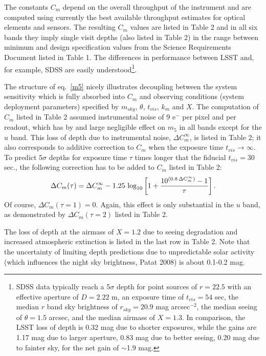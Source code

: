 The constants $C_m$ depend on the overall throughput of the instrument
and are computed using currently the best available throughput estimates for
optical elements and sensors. The resulting $C_m$ values are listed in Table 2
and in all six bands they imply single visit depths (also listed in Table 2) in the range
between minimum and design specification values from the Science Requirements
Document listed in Table 1.
The differences in performance between LSST and, for example, SDSS are easily
understood\footnote{SDSS data
typically reach a 5$\sigma$ depth for point sources of $r=22.5$
with an effective aperture of $D=2.22$ m, an exposure time of $t_{vis}=54$
sec, the median $r$ band sky brightness of $r_{sky}=20.9$ mag arcsec$^{-2}$,
the median seeing of $\theta=1.5$ arcsec, and the median airmass of $X=1.3$.
In comparison, the LSST loss of depth is 0.32 mag due to shorter exposures,
while the gains are 1.17 mag due to larger aperture, 0.83 mag due to better
seeing, 0.20 mag due to fainter sky, for the net gain of $\sim$1.9 mag.}.

The structure of eq.~\ref{m5} nicely illustrates decoupling between the system
sensitivity which is fully absorbed into $C_m$ and observing conditions
(system deployment parameters) specified by $m_{sky}$, $\theta$, $t_{vis}$, $k_m$
and $X$. The computation of $C_m$ listed in Table 2 assumed instrumental noise of
9 e$^-$ per pixel and per readout, which has by and large negligible effect on $m_5$ in
all bands except for the $u$ band. This loss of depth due to instrumental noise, $\Delta C^{\infty}_m$,
is listed in Table 2; it also corresponds to additive correction to $C_m$ when the
exposure time $t_{vis} \rightarrow \infty$. To predict $5\sigma$ depths for
exposure time $\tau$ times longer that the fiducial $t_{vis} = 30$ sec., the
following correction has to be added to $C_m$ listed in Table 2:
\begin{equation}
\label{eq:DCm}
 \Delta C_m(\tau) = \Delta C^\infty_m - 1.25\,\log_{10}\left[1 + {10^{(0.8 \, \Delta C^\infty_m)} - 1 \over \tau}  \right].
\end{equation}
Of course, $\Delta C_m(\tau=1)=0$. Again, this effect is only substantial in the $u$
band, as demonstrated by $\Delta C_m(\tau = 2)$ listed in Table 2.

The loss of depth at the airmass of $X=1.2$ due to seeing degradation
and increased atmospheric extinction is listed in the last row in Table 2. Note
that the uncertainty of limiting depth predictions due to unpredictable solar
activity (which influences the night sky brightness, Patat 2008) is about
0.1-0.2 mag.




